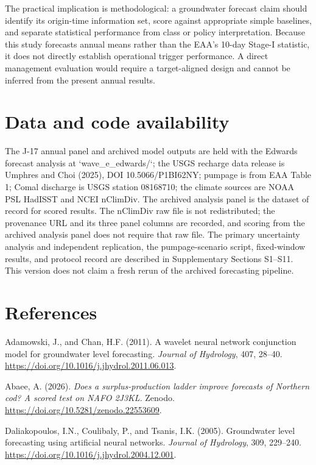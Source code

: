 \documentclass[11pt]{article}
\begin{document}
The practical implication is methodological: a groundwater forecast claim should identify its origin-time information set, score against appropriate simple baselines, and separate statistical performance from class or policy interpretation. Because this study forecasts annual means rather than the EAA's 10-day Stage-I statistic, it does not directly establish operational trigger performance. A direct management evaluation would require a target-aligned design and cannot be inferred from the present annual results.

\section*{Data and code availability}

The J-17 annual panel and archived model outputs are held with the Edwards forecast analysis at `wave\_e\_edwards/`; the USGS recharge data release is Umphres and Choi (2025), DOI 10.5066/P1BI62NY; pumpage is from EAA Table 1; Comal discharge is USGS station 08168710; the climate sources are NOAA PSL HadISST and NCEI nClimDiv. The archived analysis panel is the dataset of record for scored results. The nClimDiv raw file is not redistributed; the provenance URL and its three panel columns are recorded, and scoring from the archived analysis panel does not require that raw file. The primary uncertainty analysis and independent replication, the pumpage-scenario script, fixed-window results, and protocol record are described in Supplementary Sections S1--S11. This version does not claim a fresh rerun of the archived forecasting pipeline.

\small
\section*{References}

Adamowski, J., and Chan, H.F. (2011). A wavelet neural network conjunction model for groundwater level forecasting. \emph{Journal of Hydrology}, 407, 28--40. \url{https://doi.org/10.1016/j.jhydrol.2011.06.013}.

Abaee, A. (2026). \emph{Does a surplus-production ladder improve forecasts of Northern cod? A scored test on NAFO 2J3KL}. Zenodo. \url{https://doi.org/10.5281/zenodo.22553609}.

Daliakopoulos, I.N., Coulibaly, P., and Tsanis, I.K. (2005). Groundwater level forecasting using artificial neural networks. \emph{Journal of Hydrology}, 309, 229--240. \url{https://doi.org/10.1016/j.jhydrol.2004.12.001}.
\end{document}
